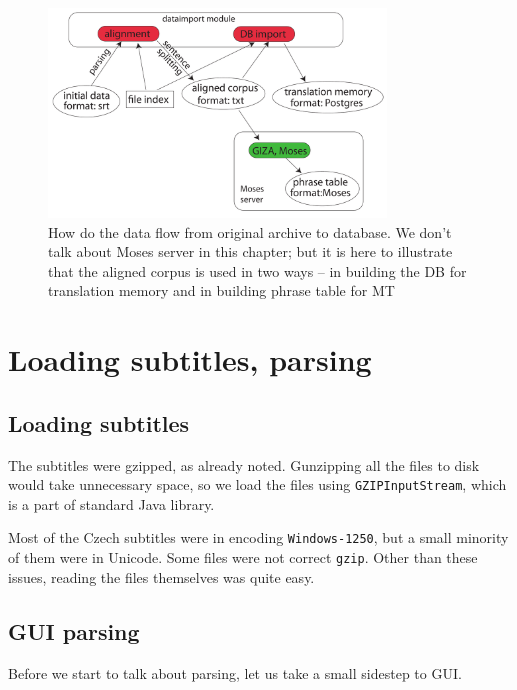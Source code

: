 
\begin{figure}[t]
\begin{center}
\includegraphics[width=0.8\textwidth]{figures/data_flow.pdf}
\end{center}
\caption{How do the data flow from original archive to database. We don't talk about Moses server in this chapter; but it is here to illustrate that the aligned corpus is used in two ways -- in building the DB for translation memory and in building phrase table for MT}\label{dataflow}
\end{figure}

\section{Loading subtitles, parsing}
\subsection*{Loading subtitles}
The subtitles were gzipped, as already noted. Gunzipping all the files to disk would take unnecessary space, so we load the files using \texttt{GZIPInputStream}, which is a part of standard Java library.

Most of the Czech subtitles were in encoding \texttt{Windows-1250}, but a small minority of them were in Unicode. Some files were not correct \texttt{gzip}. Other than these issues, reading the files themselves was quite easy.

\subsection*{GUI parsing}
Before we start to talk about parsing, let us take a small sidestep to GUI. 

